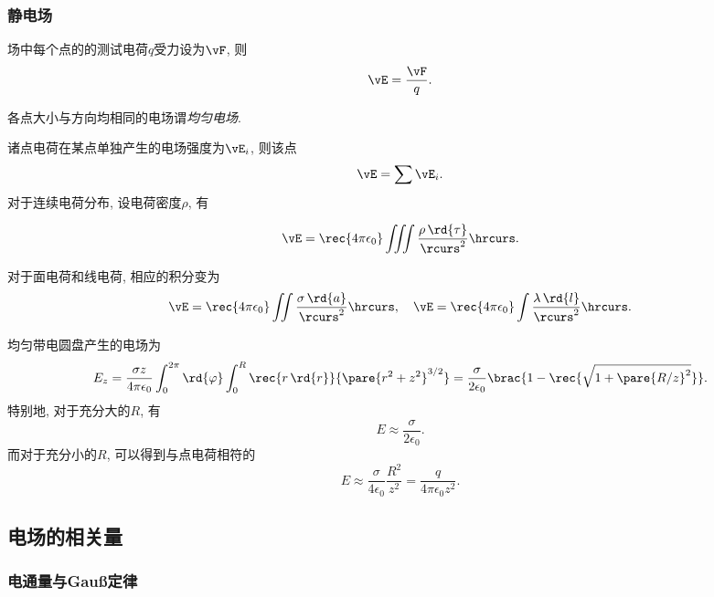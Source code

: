 \documentclass[../Electromagnetism.tex]{subfiles}
\begin{document}

\subsubsection{静电场} %
\label{ssub:静电场}

\begin{definition}[电场强度]
	场中每个点的的测试电荷$q$受力设为$\vF$, 则
	\[ \vE = \frac{\vF}{q}. \]
\end{definition}
各点大小与方向均相同的电场谓\emph{均匀电场}.
\begin{corollary}[电场强度的叠加原理]
	诸点电荷在某点单独产生的电场强度为$\vE_i$, 则该点
	\[ \vE = \sum \vE_i.\]
	对于连续电荷分布, 设电荷密度$\rho$, 有
	\begin{finale}
		\[ \vE = \rec{4\pi\epsilon_0}\iiint \frac{\rho\,\rd{\tau}}{\rcurs^2}\hrcurs. \]
	\end{finale}
	对于面电荷和线电荷, 相应的积分变为
	\begin{equation*}
		\label{eq:面电荷和线电荷的电场的积分表示}
		\vE = \rec{4\pi\epsilon_0}\iint \frac{\sigma\,\rd{a}}{\rcurs^2}\hrcurs,\quad \vE = \rec{4\pi\epsilon_0}\int \frac{\lambda\,\rd{l}}{\rcurs^2}\hrcurs.
	\end{equation*}
\end{corollary}
\begin{ex}
	\label{ex:均匀带电圆盘的电场}
	均匀带电圆盘产生的电场为
	\[ E_z = \frac{\sigma z}{4\pi\epsilon_0}\int_0^{2\pi}\rd{\varphi}\int_0^R \rec{r\,\rd{r}}{\pare{r^2+z^2}^{3/2}} = \frac{\sigma}{2\epsilon_0}\brac{1-\rec{\sqrt{1+\pare{R/z}^2}}}. \]
	特别地, 对于充分大的$R$, 有
	\[ E \approx \frac{\sigma}{2\epsilon_0}. \]
	而对于充分小的$R$, 可以得到与点电荷相符的
	\[ E \approx \frac{\sigma}{4\epsilon_0}\frac{R^2}{z^2} = \frac{q}{4\pi\epsilon_0 z^2}. \]
\end{ex}



\subsection{电场的相关量} %
\label{sub:电场的相关量}

\subsubsection{电通量与Gau\ss 定律} %
\label{ssub:电通量与gauss_定律}
\end{document}
